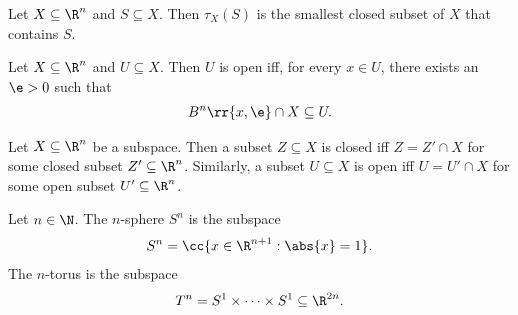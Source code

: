 \documentclass{article}
\begin{document}
\begin{theorem}
	\label{thm:closure-smallest-subset}
	Let $X\subseteq\R^n$ and $S\subseteq X$. Then $\tau_X(S)$ is the smallest closed subset
	of $X$ that contains $S$.
\end{theorem}

\begin{theorem}
	\label{thm:open-epsillon}
	Let $X\subseteq\R^n$ and $U\subseteq X$. Then $U$ is open iff, for every $x\in U$, there
	exists an $\e>0$ such that \begin{align*}
		B^n \rr{ x, \e } \cap X \subseteq U.
	\end{align*}
\end{theorem}

\begin{theorem}
	Let $X\subseteq\R^n$ be a subspace. Then a subset $Z\subseteq X$ is closed iff $Z=Z'\cap X$
	for some closed subset $Z'\subseteq \R^n$. Similarly, a subset $U\subseteq X$ is open iff
	$U=U'\cap X$ for some open subset $U'\subseteq\R^n$.
\end{theorem}

\begin{definition}
	\label{def:nsphere}
	Let $n\in\N$. The $n$-sphere $S^n$ is the subspace
	\begin{align*}
		S^n = \cc{ x \in \R^{n+1} : \abs{ x } = 1 }.
	\end{align*}
	The $n$-torus is the subspace
	\begin{align*}
		T^n = S^1 \times \cdots \times S^1 \subseteq \R^{2n}.
	\end{align*}
\end{definition}
\end{document}
